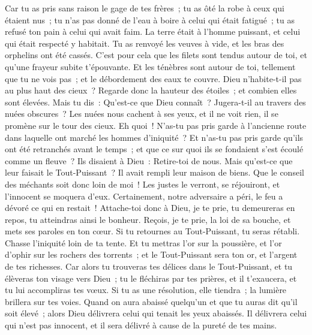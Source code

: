 \begin{multicols}{2}
Car tu as pris sans raison le gage de tes frères~; tu as ôté la robe à ceux qui étaient nus~;
tu n'as pas donné de l'eau à boire à celui qui était fatigué~; tu as refusé ton pain à celui qui avait faim.
La terre était à l'homme puissant, et celui qui était respecté y habitait. 
Tu as renvoyé les veuves à vide, et les bras des orphelins ont été cassés.
C'est pour cela que les filets sont tendus autour de toi, et qu'une frayeur subite t'épouvante. 
Et les ténèbres sont autour de toi, tellement que tu ne vois pas~; et le débordement des eaux te couvre.
Dieu n'habite-t-il pas au plus haut des cieux~? Regarde donc la hauteur des étoiles~; et combien elles sont élevées.
Mais tu dis~: Qu'est-ce que Dieu connaît~? Jugera-t-il au travers des nuées obscures~? 
Les nuées nous cachent à ses yeux, et il ne voit rien, il se promène sur le tour des cieux. 
Eh quoi~! N'as-tu pas pris garde à l'ancienne route dans laquelle ont marché les hommes d'iniquité~?
Et n'as-tu pas pris garde qu'ils ont été retranchés avant le temps~; et que ce sur quoi ils se fondaient s'est écoulé comme un fleuve~?
Ils disaient à Dieu~: Retire-toi de nous. Mais qu'est-ce que leur faisait le Tout-Puissant~?
Il avait rempli leur maison de biens. Que le conseil des méchants soit donc loin de moi~!
Les justes le verront, se réjouiront, et l'innocent se moquera d'eux.
Certainement, notre adversaire a péri, le feu a dévoré ce qui en restait~!
Attache-toi donc à Dieu, je te prie, tu demeureras en repos, tu atteindras ainsi le bonheur.
Reçois, je te prie, la loi de sa bouche, et mets ses paroles en ton cœur.
Si tu retournes au Tout-Puissant, tu seras rétabli. Chasse l'iniquité loin de ta tente.
Et tu mettras l'or sur la poussière, et l'or d'ophir sur les rochers des torrents~;
et le Tout-Puissant sera ton or, et l'argent de tes richesses.
Car alors tu trouveras tes délices dans le Tout-Puissant, et tu élèveras ton visage vers Dieu~; 
tu le fléchiras par tes prières, et il t'exaucera, et tu lui accompliras tes vœux.
Si tu as une résolution, elle tiendra~; la lumière brillera sur tes voies.
Quand on aura abaissé quelqu'un et que tu auras dit qu'il soit élevé~; alors Dieu délivrera celui qui tenait les yeux abaissés.
Il délivrera celui qui n'est pas innocent, et il sera délivré à cause de la pureté de tes mains.

\end{multicols}
